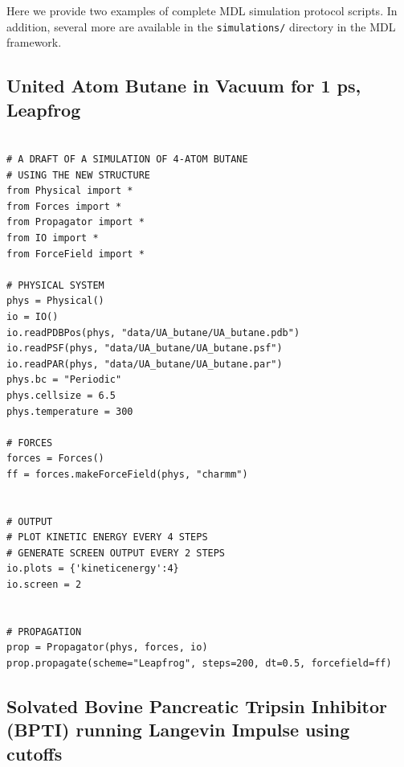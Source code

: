 \documentclass[11pt]{report}
\begin{document}
Here we provide two examples of complete MDL simulation protocol scripts.  In addition, several more are available in the \texttt{simulations/} directory in the MDL framework.

\subsection{United Atom Butane in Vacuum for 1 ps, Leapfrog}

\begin{verbatim}

# A DRAFT OF A SIMULATION OF 4-ATOM BUTANE
# USING THE NEW STRUCTURE
from Physical import *
from Forces import *
from Propagator import *
from IO import *
from ForceField import *

# PHYSICAL SYSTEM
phys = Physical()
io = IO()
io.readPDBPos(phys, "data/UA_butane/UA_butane.pdb")
io.readPSF(phys, "data/UA_butane/UA_butane.psf")
io.readPAR(phys, "data/UA_butane/UA_butane.par")
phys.bc = "Periodic"
phys.cellsize = 6.5
phys.temperature = 300

# FORCES
forces = Forces()
ff = forces.makeForceField(phys, "charmm")


# OUTPUT
# PLOT KINETIC ENERGY EVERY 4 STEPS
# GENERATE SCREEN OUTPUT EVERY 2 STEPS
io.plots = {'kineticenergy':4}
io.screen = 2


# PROPAGATION
prop = Propagator(phys, forces, io)
prop.propagate(scheme="Leapfrog", steps=200, dt=0.5, forcefield=ff)
\end{verbatim}


\newpage
\subsection{Solvated Bovine Pancreatic Tripsin Inhibitor (BPTI) running Langevin Impulse using cutoffs}
\end{document}
